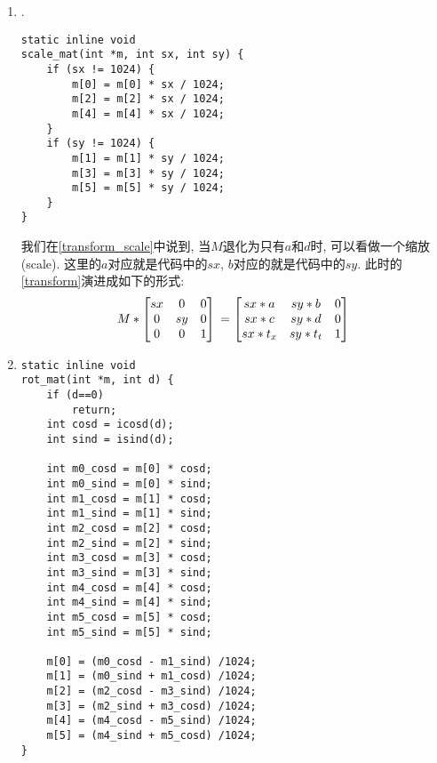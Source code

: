 {\begin {enumerate}
    \item { {}.
        \begin{lstlisting}[language={[ANSI]C}]
static inline void
scale_mat(int *m, int sx, int sy) {
    if (sx != 1024) {
        m[0] = m[0] * sx / 1024;
        m[2] = m[2] * sx / 1024;
        m[4] = m[4] * sx / 1024;
    }
    if (sy != 1024) {
        m[1] = m[1] * sy / 1024;
        m[3] = m[3] * sy / 1024;
        m[5] = m[5] * sy / 1024;
    }
}
        \end{lstlisting}
        我们在\eqref{transform_scale}中说到, 当$M$退化为只有$a$和$d$时, 可以看做一个缩放(scale). 这里的$a$对应就是代码中的$sx$, $b$对应的就是代码中的$sy$. 此时的\eqref{transform}演进成如下的形式:
        \begin{equation}
            M *
            \begin{bmatrix}
                sx  &   0   &   0\\
                0   &   sy  &   0\\
                0   &   0   &   1
            \end{bmatrix}\\
            =
            \begin{bmatrix}
                sx*a    &   sy*b    &   0\\
                sx*c    &   sy*d    &   0\\
                sx*t_x  &   sy*t_t  &   1
            \end{bmatrix}\\
        \end{equation}
    }

    \gaccobsplitinv

    \item { {}
        \begin{lstlisting}[language={[ANSI]C}]
static inline void
rot_mat(int *m, int d) {
    if (d==0)
        return;
    int cosd = icosd(d);
    int sind = isind(d);

    int m0_cosd = m[0] * cosd;
    int m0_sind = m[0] * sind;
    int m1_cosd = m[1] * cosd;
    int m1_sind = m[1] * sind;
    int m2_cosd = m[2] * cosd;
    int m2_sind = m[2] * sind;
    int m3_cosd = m[3] * cosd;
    int m3_sind = m[3] * sind;
    int m4_cosd = m[4] * cosd;
    int m4_sind = m[4] * sind;
    int m5_cosd = m[5] * cosd;
    int m5_sind = m[5] * sind;

    m[0] = (m0_cosd - m1_sind) /1024;
    m[1] = (m0_sind + m1_cosd) /1024;
    m[2] = (m2_cosd - m3_sind) /1024;
    m[3] = (m2_sind + m3_cosd) /1024;
    m[4] = (m4_cosd - m5_sind) /1024;
    m[5] = (m4_sind + m5_cosd) /1024;
}
        \end{lstlisting}

}
\end{enumerate}}

